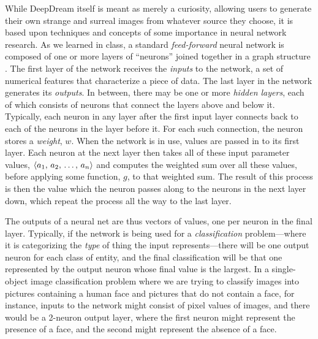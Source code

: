 \documentclass[leqno,12pt]{article}
\begin{document}
While DeepDream itself is meant as merely a curiosity, allowing users to generate their own strange and surreal
images from whatever source they choose, it is based upon techniques and concepts of some importance in neural network
research.  As we learned in class, a standard \emph{feed-forward} neural network is composed of one or more
layers of ``neurons'' joined together in a graph structure \cite[\S18.7]{RussellNorvig10}.  The first
layer of the network receives the \emph{inputs} to the network, a set of numerical features that characterize a
piece of data.  The last layer in the network generates its \emph{outputs}. In between, there may be one or more
\emph{hidden layers}, each of which consists of neurons that connect the layers above and below it.  Typically,
each neuron in any layer after the first input layer connects back to each of the neurons in the layer before
it.  For each such connection, the neuron stores a \emph{weight}, $w$.  When the network is in use, values are
passed in to its first layer.  Each neuron at the next layer then takes all of these input parameter values,
$\langle a_1,\, a_2,\, \ldots,\, a_n \rangle$ and computes the weighted sum over all these values, before applying some
function, $g$, to that weighted sum.  The result of this process is then the value which the neuron passes along
to the neurons in the next layer down, which repeat the process all the way to the last layer.  

The outputs of a neural net are thus vectors of values, one per neuron in the final layer.  Typically, if the
network is being used for a \emph{classification} problem---where it is categorizing the \emph{type} of thing
the input represents---there will be one output neuron for each class of entity, and the final classification
will be that one represented by the output neuron whose final value is the largest.  In a single-object image
classification problem where we are trying to classify images into pictures containing a human face and pictures
that do not contain a face, for instance, inputs to the network might consist of pixel values of images, and
there would be a 2-neuron output layer, where the first neuron might represent the presence of a face, and the
second might represent the absence of a face.
\end{document}
